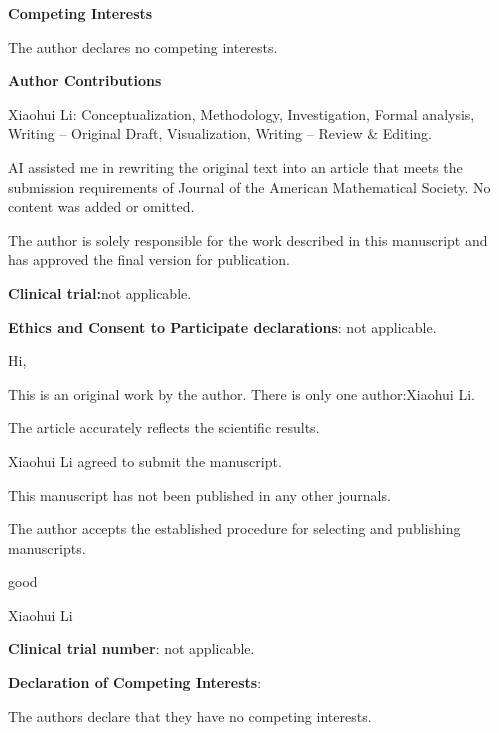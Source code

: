 \documentclass[twocolumn,11pt,a4paper]{article}
\begin{document}
 \textbf{\textbf{Competing Interests}}

The author declares no competing interests.

 \textbf{\textbf{Author Contributions}}

Xiaohui Li: Conceptualization, Methodology, Investigation, Formal analysis, Writing – Original Draft, Visualization, Writing – Review \& Editing.

AI assisted me in rewriting the original text into an article that meets the submission requirements of Journal of the American Mathematical Society. No content was added or omitted.

 The author is solely responsible for the work described in this manuscript and has approved the final version for publication.

 \textbf{\textbf{Clinical trial:}}not applicable.

 \textbf{\textbf{Ethics and Consent to Participate declarations}}: not applicable.

 Hi,

This is an original work by the author. There is only one author:Xiaohui Li.

The article accurately reflects the scientific results.

Xiaohui Li agreed to submit the manuscript.

This manuscript has not been published in any other journals.

The author accepts the established procedure for selecting and publishing manuscripts.

good

Xiaohui Li



 \textbf{\textbf{Clinical trial number}}: not applicable.
 
 \textbf{\textbf{Declaration of Competing Interests}}: 

The authors declare that they have no competing interests.
\end{document}
